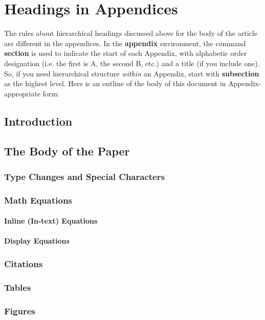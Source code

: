 \documentclass[sigconf]{nimepaper}
\begin{document}
%
%
\appendix
\section{Headings in Appendices}
The rules about hierarchical headings discussed above for
the body of the article are different in the appendices.
In the \textbf{appendix} environment, the command
\textbf{section} is used to
indicate the start of each Appendix, with alphabetic order
designation (i.e. the first is A, the second B, etc.) and
a title (if you include one).  So, if you need
hierarchical structure
\textit{within} an Appendix, start with \textbf{subsection} as the
highest level. Here is an outline of the body of this
document in Appendix-appropriate form:
\subsection{Introduction}
\subsection{The Body of the Paper}
\subsubsection{Type Changes and  Special Characters}
\subsubsection{Math Equations}
\paragraph{Inline (In-text) Equations}
\paragraph{Display Equations}
\subsubsection{Citations}
\subsubsection{Tables}
\subsubsection{Figures}
\end{document}
